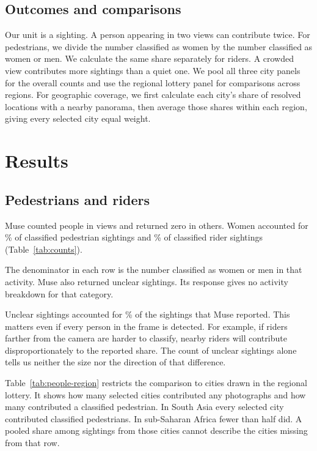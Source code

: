 \documentclass[11pt]{article}
\begin{document}
\subsection{Outcomes and comparisons}
Our unit is a sighting. A person appearing in two views can contribute twice. For pedestrians, we divide the number classified as women by the number classified as women or men. We calculate the same share separately for riders. A crowded view contributes more sightings than a quiet one. We pool all three city panels for the overall counts and use the regional lottery panel for comparisons across regions. For geographic coverage, we first calculate each city's share of resolved locations with a nearby panorama, then average those shares within each region, giving every selected city equal weight.

\section{Results}
\subsection{Pedestrians and riders}
Muse counted people in \MWOccupied{} views and returned zero in \MWModelEmpty{} others. Women accounted for \MWPedPct\% of classified pedestrian sightings and \MWRiderPct\% of classified rider sightings (Table~\ref{tab:counts}).

\begin{table}[htbp]\centering\small
\caption{Sightings classified by Muse in the reviewed Street View images.}
\label{tab:counts}

\par\smallskip\parbox{.90\linewidth}{\footnotesize The denominator in each row is the number classified as women or men in that activity. Muse also returned \MWUnclear{} unclear sightings. Its response gives no activity breakdown for that category.}
\end{table}

Unclear sightings accounted for \MWUnclearPct\% of the \MWSightings{} sightings that Muse reported. This matters even if every person in the frame is detected. For example, if riders farther from the camera are harder to classify, nearby riders will contribute disproportionately to the reported share. The count of unclear sightings alone tells us neither the size nor the direction of that difference.

Table~\ref{tab:people-region} restricts the comparison to cities drawn in the regional lottery. It shows how many selected cities contributed any photographs and how many contributed a classified pedestrian. In South Asia every selected city contributed classified pedestrians. In sub-Saharan Africa fewer than half did. A pooled share among sightings from those cities cannot describe the cities missing from that row.
\end{document}
